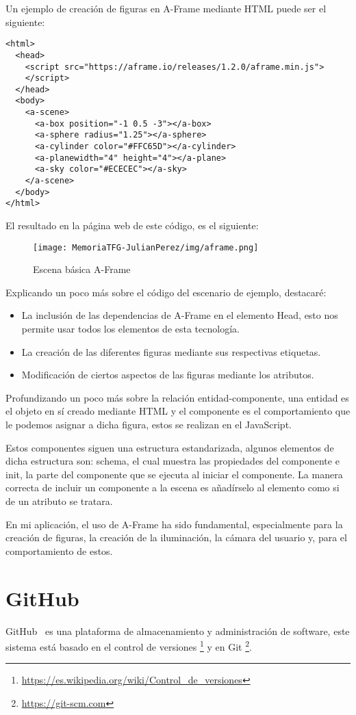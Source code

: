 \documentclass[a4paper, 12pt]{book}
\begin{document}
Un ejemplo de creación de figuras en A-Frame mediante HTML puede ser el siguiente:
{\scriptsize
\begin{verbatim}
<html>
  <head>
    <script src="https://aframe.io/releases/1.2.0/aframe.min.js">
    </script>
  </head>
  <body>
    <a-scene>
      <a-box position="-1 0.5 -3"></a-box>
      <a-sphere radius="1.25"></a-sphere>
      <a-cylinder color="#FFC65D"></a-cylinder>
      <a-planewidth="4" height="4"></a-plane>
      <a-sky color="#ECECEC"></a-sky>
    </a-scene>
  </body>
</html>
\end{verbatim}
}
El resultado en la página web de este código, es el siguiente:
\begin{figure}[H]
  \centering
  \texttt{[image: MemoriaTFG-JulianPerez/img/aframe.png]}
  \caption{Escena básica A-Frame}\label{aframe}
\end{figure}
Explicando un poco más sobre el código del escenario de ejemplo, destacaré: 
\begin{itemize}
    \item La inclusión de las dependencias de A-Frame en el elemento Head, esto nos permite usar todos los elementos de esta tecnología.
    \item La creación de las diferentes figuras mediante sus respectivas etiquetas.
    \item Modificación de ciertos aspectos de las figuras mediante los atributos.
\end{itemize}
Profundizando un poco más sobre la relación entidad-componente, una entidad es el objeto en sí creado mediante HTML y el componente es el comportamiento que le podemos asignar a dicha figura, estos se realizan en el JavaScript. 

Estos componentes siguen una estructura estandarizada, algunos elementos de dicha estructura son: schema, el cual muestra las propiedades del componente e init, la parte del componente que se ejecuta al iniciar el componente. La manera correcta de incluir un componente a la escena es añadírselo al elemento como si de un atributo se tratara.

En mi aplicación, el uso de A-Frame ha sido fundamental, especialmente para la creación de figuras, la creación de la iluminación, la cámara del usuario y, para el comportamiento de estos.

\section{GitHub} %
\label{sec:GitHub}
GitHub~\cite{GITHUB} es una plataforma de almacenamiento y administración  de software, este sistema está basado en el control de versiones \footnote{\url{https://es.wikipedia.org/wiki/Control_de_versiones}} y en Git \footnote{\url{https://git-scm.com}}.
\end{document}
